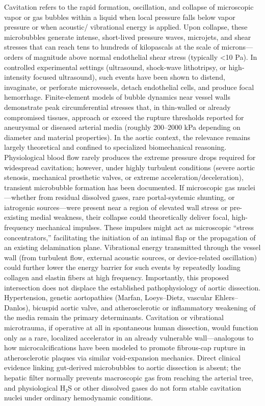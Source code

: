 Cavitation refers to the rapid formation, oscillation, and collapse of microscopic vapor or gas bubbles within a liquid when local pressure falls below vapor pressure or when acoustic/ vibrational energy is applied. Upon collapse, these microbubbles generate intense, short-lived pressure waves, microjets, and shear stresses that can reach tens to hundreds of kilopascals at the scale of microns—orders of magnitude above normal endothelial shear stress (typically <10 Pa). In controlled experimental settings (ultrasound, shock-wave lithotripsy, or high-intensity focused ultrasound), such events have been shown to distend, invaginate, or perforate microvessels, detach endothelial cells, and produce focal hemorrhage. Finite-element models of bubble dynamics near vessel walls demonstrate peak circumferential stresses that, in thin-walled or already compromised tissues, approach or exceed the rupture thresholds reported for aneurysmal or diseased arterial media (roughly 200–2000 kPa depending on diameter and material properties).
In the aortic context, the relevance remains largely theoretical and confined to specialized biomechanical reasoning. Physiological blood flow rarely produces the extreme pressure drops required for widespread cavitation; however, under highly turbulent conditions (severe aortic stenosis, mechanical prosthetic valves, or extreme acceleration/deceleration), transient microbubble formation has been documented. If microscopic gas nuclei—whether from residual dissolved gases, rare portal-systemic shunting, or iatrogenic sources—were present near a region of elevated wall stress or pre-existing medial weakness, their collapse could theoretically deliver focal, high-frequency mechanical impulses. These impulses might act as microscopic “stress concentrators,” facilitating the initiation of an intimal flap or the propagation of an existing delamination plane. Vibrational energy transmitted through the vessel wall (from turbulent flow, external acoustic sources, or device-related oscillation) could further lower the energy barrier for such events by repeatedly loading collagen and elastin fibers at high frequency.
Importantly, this proposed intersection does not displace the established pathophysiology of aortic dissection. Hypertension, genetic aortopathies (Marfan, Loeys–Dietz, vascular Ehlers–Danlos), bicuspid aortic valve, and atherosclerotic or inflammatory weakening of the media remain the primary determinants. Cavitation or vibrational microtrauma, if operative at all in spontaneous human dissection, would function only as a rare, localized accelerator in an already vulnerable wall—analogous to how microcalcifications have been modeled to promote fibrous-cap rupture in atherosclerotic plaques via similar void-expansion mechanics. Direct clinical evidence linking gut-derived microbubbles to aortic dissection is absent; the hepatic filter normally prevents macroscopic gas from reaching the arterial tree, and physiological H₂S or other dissolved gases do not form stable cavitation nuclei under ordinary hemodynamic conditions.
